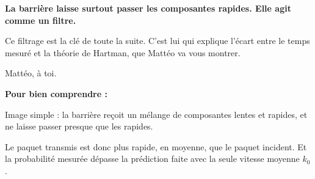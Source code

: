 \documentclass[12pt,a4paper]{article}
\newenvironment{comprendre}%
{\par\medskip\noindent\hrulefill\par\nopagebreak\textbf{Pour bien comprendre :}\par}%
{\par\nopagebreak\noindent\hrulefill\par\medskip}
\begin{document}
	\textbf{La barrière laisse surtout passer les composantes rapides.
		Elle agit comme un filtre.}
	
	Ce filtrage est la clé de toute la suite.
	C'est lui qui explique l'écart entre le temps mesuré
	et la théorie de Hartman, que Mattéo va vous montrer.
	
	Mattéo, à toi.
	
	\begin{comprendre}
		Image simple : la barrière reçoit un mélange de composantes lentes
		et rapides, et ne laisse passer presque que les rapides.
		
		Le paquet transmis est donc plus rapide, en moyenne, que le paquet
		incident. Et la probabilité mesurée dépasse la prédiction faite
		avec la seule vitesse moyenne $k_0$.
	\end{comprendre}
	
\end{document}
